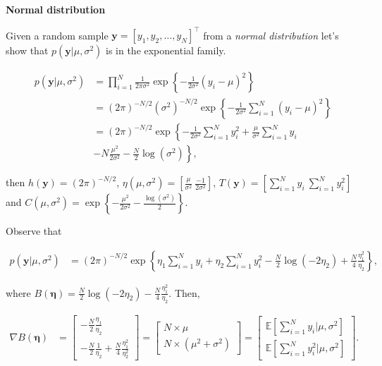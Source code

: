 \begin{enumerate}
\textbf{Normal distribution} 

Given a random sample $\mathbf{y}=[y_1,y_2,\dots,y_N]^{\top}$ from a \textit{normal distribution} let's show that $p(\mathbf{y}|\mu,\sigma^2)$ is in the exponential family.

\begin{align}
	p(\mathbf{y}|\mu,\sigma^2)&=\prod_{i=1}^N \frac{1}{2\pi\sigma^2}\exp\left\{-\frac{1}{2\sigma^2}\left(y_i-\mu\right)^2\right\}\nonumber\\
	&= (2\pi)^{-N/2}(\sigma^2)^{-N/2}\exp\left\{-\frac{1}{2\sigma^2}\sum_{i=1}^N\left(y_i-\mu\right)^2\right\}\nonumber\\
	&= (2\pi)^{-N/2}\exp\left\{-\frac{1}{2\sigma^2}\sum_{i=1}^Ny_i^2+\frac{\mu}{\sigma^2}\sum_{i=1}^N y_i\right.\nonumber\\
	&-\left.N\frac{\mu^2}{2\sigma^2}-\frac{N}{2}\log(\sigma^2)\right\}\nonumber,	
\end{align}

then $h(\mathbf{y})=(2\pi)^{-N/2}$, $\eta(\mu,\sigma^2)=\left[\frac{\mu}{\sigma^2} \ \frac{-1}{2\sigma^2}\right]$, $T(\mathbf{y})=\left[\sum_{i=1}^N y_i \ \sum_{i=1}^N y_i^2\right]$ and $C(\mu,\sigma^2)=\exp\left\{-\frac{\mu^2}{2\sigma^2}-\frac{\log(\sigma^2)}{2}\right\}$.

Observe that 

\begin{align}
	p(\mathbf{y}|\mu,\sigma^2)&= (2\pi)^{-N/2}\exp\left\{\eta_1\sum_{i=1}^N y_i+\eta_2\sum_{i=1}^Ny_i^2-\frac{N}{2}\log(-2\eta_2)+\frac{N}{4}\frac{\eta_1^2}{\eta_2}\right\}\nonumber,
\end{align}

where $B(\mathbf{\eta})=\frac{N}{2}\log(-2\eta_2)-\frac{N}{4}\frac{\eta_1^2}{\eta_2}$. Then,

\begin{align*}
	\nabla B(\mathbf{\eta}) & = \begin{bmatrix}
		-\frac{N}{2}\frac{\eta_1}{\eta_2}\\
		-\frac{N}{2}\frac{1}{\eta_2}+\frac{N}{4}\frac{\eta_1^2}{\eta_2^2}
	\end{bmatrix}
	=
	\begin{bmatrix}
		N\times\mu\\
		N\times(\mu^2+\sigma^2)
	\end{bmatrix}  = \begin{bmatrix}
		\mathbb{E}\left[\sum_{i=1}^N y_i\bigr\rvert \mu,\sigma^2\right]\\
		\mathbb{E}\left[\sum_{i=1}^N y_i^2\bigr\rvert \mu,\sigma^2\right]
	\end{bmatrix}. 
\end{align*}
\\


\end{enumerate}
